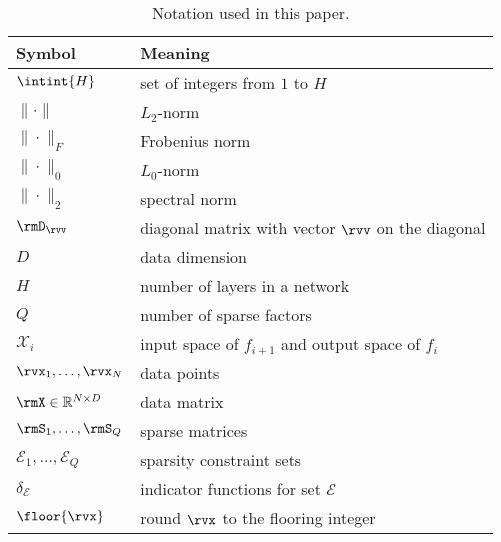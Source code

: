 

\begin{table}[t]
	\centering
	\begin{footnotesize}
	\begin{tabular}{ll}\\
\toprule
		{\bf Symbol}  & {\bf Meaning}\\
\midrule
$\intint{H}$  & set of integers from $1$ to $H$\\
$\|\cdot\|$ & $L_2$-norm\\
$\|\cdot\|_F$ &    Frobenius norm  \\
$\|\cdot\|_0$ & $L_0$-norm\\
$\|\cdot\|_2$    &    spectral norm  \\
$\rmD_\rvv$ & diagonal matrix with vector $\rvv$ on the diagonal\\                                                
$D$           & data dimension\\
$H$           & number of layers in a network\\
$Q$           & number of sparse factors\\
$\mathcal{X}_i$ & input space of $f_{i+1}$ and output space of $f_{i}$\\
$\rvx_1,\ldots, \rvx_N $        &    data points\\
$\rmX \in\mathbb{R}^{N\times D}$&    data matrix\\
$\rmS_1, \ldots, \rmS_Q$        &    sparse matrices\\
$\mathcal{E}_1, \ldots, \mathcal{E}_Q$ & sparsity constraint sets\\
$\delta_{\mathcal{E}}$ & 		indicator functions for set $\mathcal{E}$\\
$\floor{\rvx}$ & round $\rvx$ to the flooring integer\\
\bottomrule
	\end{tabular}
	\end{footnotesize}
	\caption{Notation used in this paper.}
	\label{tab:notation}
\end{table}
